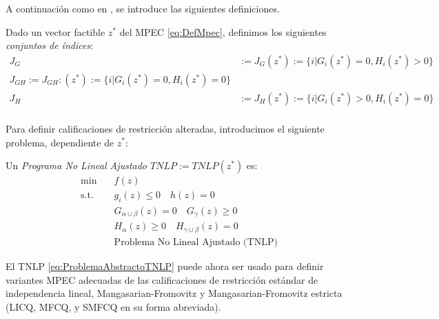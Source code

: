
A continuación como en \cite{Flegel2003AFJ}, se introduce las siguientes definiciones.
\begin{definition}
Dado un vector factible $z^*$ del MPEC \eqref{eq:DefMpec}, definimos los siguientes \textit{conjuntos de índices}:
\begin{equation}
\begin{aligned}
J_G &:= J_G(z^*) := \{i|G_i(z^*) = 0, H_i(z^*) > 0\} \\
J_{GH}:= J_{GH}:(z^*) := \{i|G_i(z^*) = 0, H_i(z^*) = 0\}  \\
J_H &:= J_H(z^*) := \{i|G_i(z^*) > 0, H_i(z^*) = 0\}  \\
\end{aligned}
\label{eq:ConjuntoDeIndices} 
\end{equation}
\end{definition}

Para definir calificaciones de restricción alteradas, introducimos el siguiente problema, dependiente de $z^*$:

\begin{definition}

Un \textit{Programa No Lineal Ajustado $TNLP := TNLP(z^*)$} es:
\begin{equation}
\begin{aligned} 
\min \quad & f(z) \\
\text{s.t.} \quad & g_{i}(z) \leq 0 \quad h(z) = 0  \\
& G_{\alpha \cup \beta}(z) = 0 \quad G_{\gamma}(z) \geq 0  \\
& H_{\alpha}(z) \geq 0 \quad H_{\gamma \cup \beta}(z) = 0  \\
& \text{Problema No Lineal Ajustado (TNLP)}  
\end{aligned}
\label{eq:ProblemaAbstractoTNLP}
\end{equation}
    
\end{definition}

El TNLP \eqref{eq:ProblemaAbstractoTNLP} puede ahora ser usado para definir variantes MPEC adecuadas de las calificaciones de restricción estándar de independencia lineal, Mangasarian-Fromovitz y Mangasarian-Fromovitz estricta (LICQ, MFCQ, y SMFCQ en su forma abreviada).

